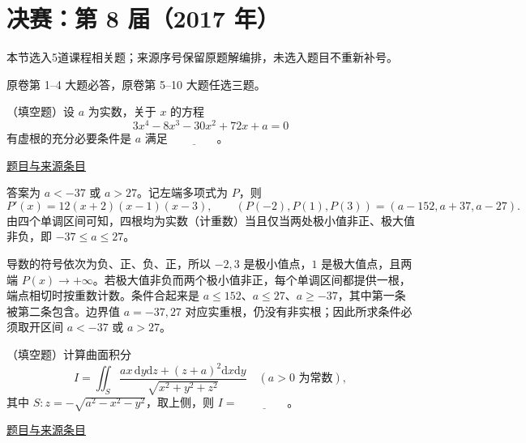 \documentclass[12pt,fontset=fandol]{ctexart}
\begin{document}
\section{决赛：第 8 届（2017 年）}

本节选入5道课程相关题；来源序号保留原题解编排，未选入题目不重新补号。

\begin{remark}[来源说明]原卷第 1--4 大题必答，原卷第 5--10 大题任选三题。\end{remark}

\begin{example}[来源序号2]\label{ex:fin08-hi:2}\label{pr:fin08-hi:2}

（填空题）设 $a$ 为实数，关于 $x$ 的方程
\[
3x^{4}-8x^{3}-30x^{2}+72x+a=0
\]
有虚根的充分必要条件是 $a$ 满足 $\underline{\qquad\qquad}$。

\par\href{https://github.com/lzxcr/cmc-mathematics/blob/64916fa1fdbc3e444a652eca204d5669058ee321/src/problems/finals/08/02.md}{题目与来源条目}

\end{example}

\begin{solve}\label{ans:fin08-hi:2}

答案为 $a<-37$ 或 $a>27$。记左端多项式为 $P$，则
\[
P'(x)=12(x+2)(x-1)(x-3),\qquad(P(-2),P(1),P(3))=(a-152,a+37,a-27).
\]
由四个单调区间可知，四根均为实数（计重数）当且仅当两处极小值非正、极大值非负，即 $-37\leq a\leq27$。

导数的符号依次为负、正、负、正，所以 $-2,3$ 是极小值点，$1$ 是极大值点，且两端 $P(x)\to+\infty$。若极大值非负而两个极小值非正，每个单调区间都提供一根，端点相切时按重数计数。条件合起来是 $a\le152$、$a\le27$、$a\ge-37$，其中第一条被第二条包含。边界值 $a=-37,27$ 对应实重根，仍没有非实根；因此所求条件必须取开区间 $a<-37$ 或 $a>27$。

\end{solve}

\begin{example}[来源序号3]\label{ex:fin08-hi:3}\label{pr:fin08-hi:3}

（填空题）计算曲面积分
\[
I=\iint_{S}\frac{ax\,\mathrm{d}y\mathrm{d}z+\left(z+a\right)^{2}\mathrm{d}x\mathrm{d}y}{\sqrt{x^{2}+y^{2}+z^{2}}}\quad (a>0 \text{ 为常数}),
\]
其中 $S:z=-\sqrt{a^{2}-x^{2}-y^{2}}$，取上侧，则 $I=$ $\underline{\qquad\qquad}$。

\par\href{https://github.com/lzxcr/cmc-mathematics/blob/64916fa1fdbc3e444a652eca204d5669058ee321/src/problems/finals/08/03.md}{题目与来源条目}

\end{example}
\end{document}
